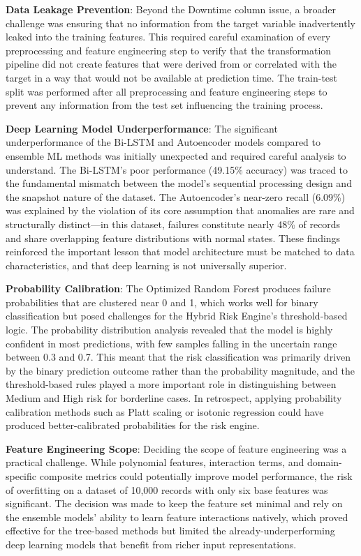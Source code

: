 \documentclass[12pt,letterpaper]{report}
\begin{document}
\textbf{Data Leakage Prevention}: Beyond the Downtime column issue, a broader challenge was ensuring that no information from the target variable inadvertently leaked into the training features. This required careful examination of every preprocessing and feature engineering step to verify that the transformation pipeline did not create features that were derived from or correlated with the target in a way that would not be available at prediction time. The train-test split was performed after all preprocessing and feature engineering steps to prevent any information from the test set influencing the training process.

\textbf{Deep Learning Model Underperformance}: The significant underperformance of the Bi-LSTM and Autoencoder models compared to ensemble ML methods was initially unexpected and required careful analysis to understand. The Bi-LSTM's poor performance (49.15\% accuracy) was traced to the fundamental mismatch between the model's sequential processing design and the snapshot nature of the dataset. The Autoencoder's near-zero recall (6.09\%) was explained by the violation of its core assumption that anomalies are rare and structurally distinct---in this dataset, failures constitute nearly 48\% of records and share overlapping feature distributions with normal states. These findings reinforced the important lesson that model architecture must be matched to data characteristics, and that deep learning is not universally superior.

\textbf{Probability Calibration}: The Optimized Random Forest produces failure probabilities that are clustered near 0 and 1, which works well for binary classification but posed challenges for the Hybrid Risk Engine's threshold-based logic. The probability distribution analysis revealed that the model is highly confident in most predictions, with few samples falling in the uncertain range between 0.3 and 0.7. This meant that the risk classification was primarily driven by the binary prediction outcome rather than the probability magnitude, and the threshold-based rules played a more important role in distinguishing between Medium and High risk for borderline cases. In retrospect, applying probability calibration methods such as Platt scaling or isotonic regression could have produced better-calibrated probabilities for the risk engine.

\textbf{Feature Engineering Scope}: Deciding the scope of feature engineering was a practical challenge. While polynomial features, interaction terms, and domain-specific composite metrics could potentially improve model performance, the risk of overfitting on a dataset of 10,000 records with only six base features was significant. The decision was made to keep the feature set minimal and rely on the ensemble models' ability to learn feature interactions natively, which proved effective for the tree-based methods but limited the already-underperforming deep learning models that benefit from richer input representations.
\end{document}
